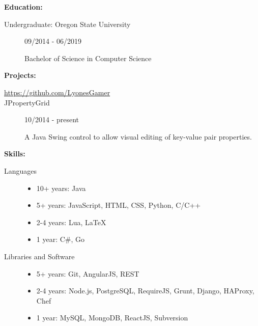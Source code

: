 \documentclass[11pt]{article}
\begin{document}
\smallskip
{\huge \textbf{Education:}}
\hrulefill
\smallskip
\begin{description}
\item[Undergraduate: Oregon State University]
\hfill 09/2014 - 06/2019

Bachelor of Science in Computer Science
\end{description}
\smallskip
{\huge \textbf{Projects:}}
\hrulefill
\smallskip
\begin{description}
\item[\url{https://github.com/LyonesGamer}]
\smallskip
\item[JPropertyGrid]
\hfill 10/2014 - present

A Java Swing control to allow visual editing of key-value pair properties.
\end{description}
\bigskip
{\huge \textbf{Skills:}}
\hrulefill
\smallskip
\begin{description}
\item[Languages]
\hfill
\begin{itemize}
\item 10+ years: Java
\item 5+ years: JavaScript, HTML, CSS, Python, C/C++
\item 2-4 years: Lua, LaTeX
\item 1 year: C\#, Go
\end{itemize}
\item[Libraries and Software]
\hfill
\begin{itemize}
\item 5+ years: Git, AngularJS, REST
\item 2-4 years: Node.js, PostgreSQL, RequireJS, Grunt, Django, HAProxy, Chef
\item 1 year: MySQL, MongoDB, ReactJS, Subversion
\end{itemize}
\end{description}
\end{document}
